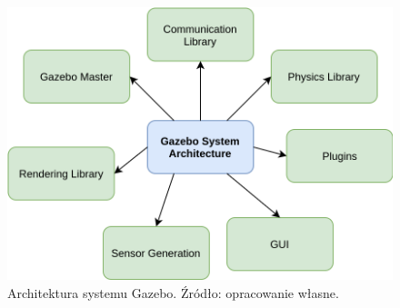 \begin{figure}
	\centering
	\includegraphics[width=0.7\linewidth]{rozdzial5/images/gazebo_system_architecture}
	\caption{Architektura systemu Gazebo. Źródło: opracowanie własne.}
	\label{fig:gazebosystemarchitecture}
\end{figure}
